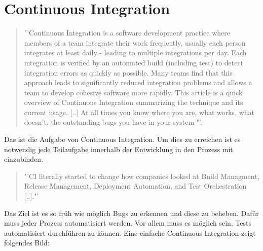 \section{Continuous Integration}
\label{sec:ContinuousIntegration}
\begin{quote}
	"'Continuous Integration is a software development practice where members of a team integrate their work frequently, usually each person integrates at least daily - leading to multiple integrations per day. Each integration is verified by an automated build (including test) to detect integration errors as quickly as possible. Many teams find that this approach leads to significantly reduced integration problems and allows a team to develop cohesive software more rapidly. This article is a quick overview of Continuous Integration summarizing the technique and its current usage. [..] At all times you know where you are, what works, what doesn't, the outstanding bugs you have in your system "'\cite{Fowler:CI}. 
\end{quote}
Das ist die Aufgabe von Continuous Integration. Um dies zu erreichen ist es notwendig jede Teilaufgabe innerhalb der Entwicklung in den Prozess mit einzubinden. 
\begin{quote}
	"'CI literally started to change how companies looked at Build Managment, Release Management, Deployment Automation, and Test Orchestration [..]."'\cite{IEEE:CDMitJenkins}
\end{quote}
Das Ziel ist es so früh wie möglich Bugs zu erkennen und diese zu beheben. Dafür muss jeder Prozess automatisiert werden. Vor allem muss es möglich sein, Tests automatisiert durchführen zu können. Eine einfache Continuous Integration zeigt folgendes Bild:


